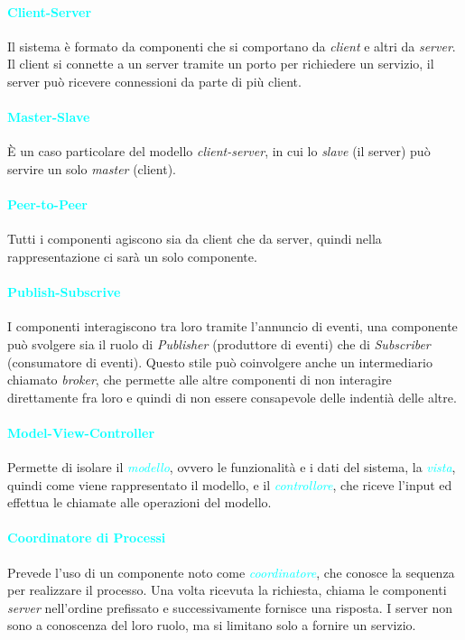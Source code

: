 \paragraph{\textcolor{cyan}{Client-Server}}
Il sistema è formato da componenti che si comportano da \emph{client} e altri da \emph{server}.
Il client si connette a un server tramite un porto per richiedere un servizio, il server può ricevere connessioni da parte
di più client.

\paragraph{\textcolor{cyan}{Master-Slave}} È un caso particolare del
modello \emph{client-server}, in cui lo \emph{slave} (il server) può servire
un solo \emph{master} (client).

\paragraph{\textcolor{cyan}{Peer-to-Peer}} Tutti i componenti agiscono sia da client che da server, quindi nella
rappresentazione ci sarà un solo componente.

\paragraph{\textcolor{cyan}{Publish-Subscrive}} I componenti interagiscono tra loro
tramite l'annuncio di eventi, una componente può svolgere sia il ruolo di \emph{Publisher} (produttore di eventi) che di
\emph{Subscriber} (consumatore di eventi). Questo stile può coinvolgere anche un
intermediario chiamato \emph{broker}, che permette alle altre componenti di non interagire direttamente
fra loro e quindi di non essere consapevole delle indentià delle altre.

\paragraph{\textcolor{cyan}{Model-View-Controller}} Permette di isolare il \emph{\textcolor{cyan}{modello}},
ovvero le funzionalità e i dati del sistema, la \emph{\textcolor{cyan}{vista}}, quindi come viene rappresentato il modello, e il 
\emph{\textcolor{cyan}{controllore}}, che riceve l'input ed effettua le chiamate alle operazioni del modello.

\paragraph{\textcolor{cyan}{Coordinatore di Processi}} Prevede l'uso di un componente noto come
\emph{\textcolor{cyan}{coordinatore}}, che conosce la sequenza per realizzare il processo. Una volta ricevuta
la richiesta, chiama le componenti \emph{server} nell'ordine prefissato e successivamente fornisce una risposta.
I server non sono a conoscenza del loro ruolo, ma si limitano solo a fornire un servizio.

